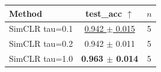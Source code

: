 \begin{tabular}{lcc}
\toprule
Method & test\_acc $\uparrow$ & $n$ \\
\midrule
SimCLR tau=0.1 & \underline{0.942 $\pm$ 0.015} & 5 \\
SimCLR tau=0.2 & 0.942 $\pm$ 0.011 & 5 \\
SimCLR tau=1.0 & \textbf{0.963 $\pm$ 0.014} & 5 \\
\bottomrule
\end{tabular}
